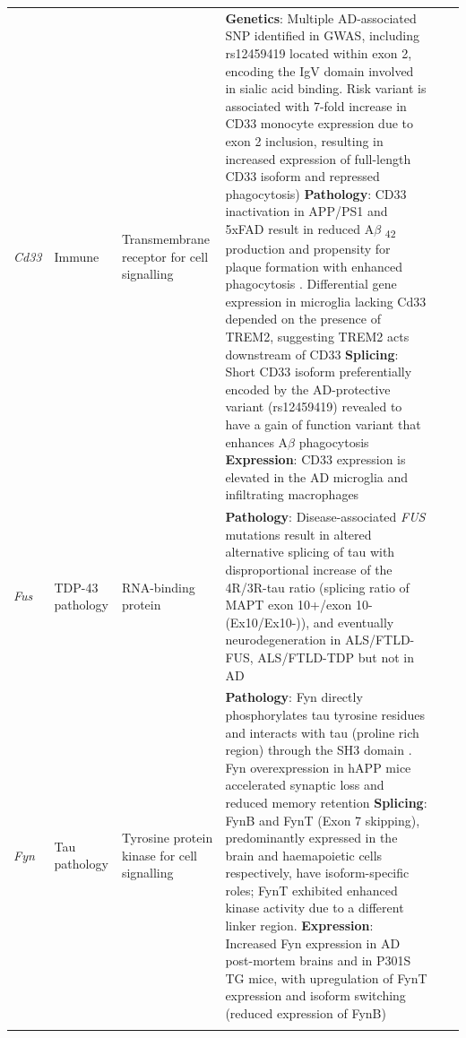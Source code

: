 \begin{changemargin}{1.5cm}
\begin{landscape}
\begin{longtable}[c]{p{1cm}p{2cm}p{4cm}p{16cm}p{1cm}p{1cm}}
			\centering \textit{Cd33} &
			\centering Immune  &
			\centering Transmembrane receptor for cell signalling &
			\tabitem \textbf{Genetics}: Multiple AD-associated SNP identified in GWAS, including  rs12459419\cite{Naj2011,Hollingworth2011,Bertram2008} located within exon 2, encoding the IgV domain involved in sialic acid binding\cite{Malik2013}. Risk variant is associated with 7-fold increase in CD33 monocyte expression due to exon 2 inclusion, resulting in increased expression of full-length CD33 isoform and repressed phagocytosis)\cite{Raj2014} 
			\tabitem \textbf{Pathology}: CD33 inactivation in APP/PS1 and 5xFAD result in reduced A$\beta$ \textsubscript{42} production and propensity for plaque formation with enhanced phagocytosis \cite{Griciuc2013}. Differential gene expression in microglia lacking Cd33 depended on the presence of TREM2, suggesting TREM2 acts downstream of CD33\cite{Griciuc2019} 			
			\tabitem \textbf{Splicing}: Short CD33 isoform preferentially encoded by the AD-protective variant (rs12459419) revealed to have a gain of function variant that enhances A$\beta$ phagocytosis \cite{Bhattacherjee2021}\newline		
			\tabitem \textbf{Expression}: CD33 expression is elevated in the AD microglia and infiltrating macrophages\cite{Griciuc2013} \\
			\hdashline[0.5pt/5pt]	
			
			\centering \textit{Fus} &
			\centering TDP-43 pathology  &
			\centering RNA-binding protein  &			
			\tabitem \textbf{Pathology}: Disease-associated \textit{FUS} mutations result in altered alternative splicing of tau with disproportional increase of the 4R/3R-tau ratio (splicing ratio of MAPT exon 10+/exon 10- (Ex10/Ex10-)), and eventually neurodegeneration in ALS/FTLD-FUS, ALS/FTLD-TDP but not in AD\cite{Ishigaki2020} \\
			\hdashline[0.5pt/5pt]
			
			\centering \textit{Fyn} &
			\centering Tau pathology  &
			\centering Tyrosine protein kinase for cell signalling &			
			\tabitem \textbf{Pathology}: Fyn directly phosphorylates tau tyrosine residues and  interacts with tau (proline rich region) through the SH3 domain \cite{Bhaskar2010}. \newline 
			\tabitem Fyn overexpression in hAPP mice accelerated synaptic loss and reduced memory retention\cite{Chin2005} \newline
			\tabitem \textbf{Splicing}: FynB and FynT (Exon 7 skipping), predominantly expressed in the brain and haemapoietic cells respectively, have isoform-specific roles; FynT exhibited enhanced kinase activity due to a different linker region. \newline
			\tabitem \textbf{Expression}: Increased Fyn expression in AD post-mortem brains\cite{Lee2016b} and in P301S TG mice\cite{Low2021}, with upregulation of FynT expression and isoform switching (reduced expression of FynB)\cite{Lee2016b} \\
			\hdashline[0.5pt/5pt]
			

\end{longtable}
\end{landscape}
\end{changemargin}
